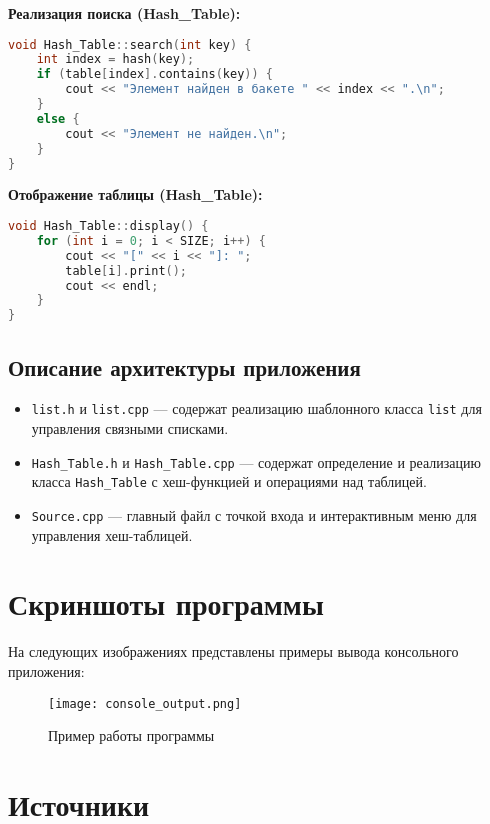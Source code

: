 \documentclass[12pt,a4paper]{scrartcl}
\begin{document}
\textbf{Реализация поиска (Hash_Table):}
\begin{lstlisting}[language=C++, caption=Метод search()]
void Hash_Table::search(int key) {
	int index = hash(key);
	if (table[index].contains(key)) {
		cout << "Элемент найден в бакете " << index << ".\n";
	}
	else {
		cout << "Элемент не найден.\n";
	}
}
\end{lstlisting}

\textbf{Отображение таблицы (Hash_Table):}
\begin{lstlisting}[language=C++, caption=Метод display()]
void Hash_Table::display() {
	for (int i = 0; i < SIZE; i++) {
		cout << "[" << i << "]: ";
		table[i].print();
		cout << endl;
	}
}
\end{lstlisting}

\subsection{Описание архитектуры приложения}

\begin{itemize}
  \item \texttt{list.h} и \texttt{list.cpp} — содержат реализацию шаблонного класса \texttt{list} для управления связными списками.
  \item \texttt{Hash_Table.h} и \texttt{Hash_Table.cpp} — содержат определение и реализацию класса \texttt{Hash_Table} с хеш-функцией и операциями над таблицей.
  \item \texttt{Source.cpp} — главный файл с точкой входа и интерактивным меню для управления хеш-таблицей.
\end{itemize}

\section{Скриншоты программы}
\label{sec:program-shots}

На следующих изображениях представлены примеры вывода консольного приложения:

\begin{figure}[H]
    \centering
    \texttt{[image: console\_output.png]}
    \caption{Пример работы программы}
    \label{fig:console-output}
\end{figure}

\section{Источники}
\end{document}
